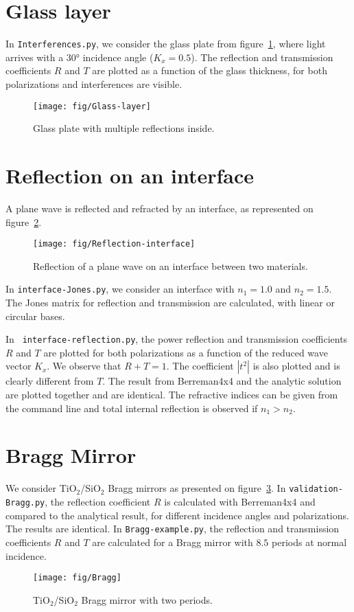 

\section{Glass layer}

In \verb/Interferences.py/, we consider the glass plate from figure~\ref{fig:Glass-layer}, where light arrives with a 30° incidence angle ($K_x=0.5$).
The reflection and transmission coefficients $R$ and $T$ are plotted as a function of the glass thickness, for both polarizations and interferences are visible.

\begin{figure}[!h]
\texttt{[image: fig/Glass-layer]}
\caption{\label{fig:Glass-layer}Glass plate with multiple reflections inside.}
\end{figure}

\section{Reflection on an interface}
A plane wave is reflected and refracted by an interface, as represented on figure~\ref{fig:Reflection-interface}. 

\begin{figure}[!h]
\texttt{[image: fig/Reflection-interface]}
\caption{\label{fig:Reflection-interface}Reflection of a plane wave on an interface between two materials.}
\end{figure}

In \verb/interface-Jones.py/, we consider an interface with $n_1=1.0$ and $n_2=1.5$.
The Jones matrix for reflection and transmission are calculated, with linear or circular bases.

In \verb/ interface-reflection.py/, the power reflection and transmission coefficients $R$ and $T$ are plotted for both polarizations as a function of the reduced wave vector $K_x$. 
We observe that $R+T=1$.
The coefficient $|t^2|$ is also plotted and is clearly different from $T$.
The result from Berreman4x4 and the analytic solution are plotted together and are identical.
The refractive indices can be given from the command line and total internal reflection is observed if $n_1>n_2$.


\section{Bragg Mirror}
We consider TiO$_2$/SiO$_2$ Bragg mirrors as presented on figure~\ref{fig:Bragg}.
In \verb/validation-Bragg.py/, the reflection coefficient $R$ is calculated with Berreman4x4 and compared to the analytical result, for different incidence angles and polarizations. 
The results are identical.
In \verb/Bragg-example.py/, the reflection and transmission coefficients $R$ and $T$ are calculated for a Bragg mirror with $8.5$ periods at normal incidence.
\begin{figure}[!h]
\texttt{[image: fig/Bragg]}
\caption{\label{fig:Bragg}TiO$_2$/SiO$_2$ Bragg mirror with two periods.}
\end{figure}

